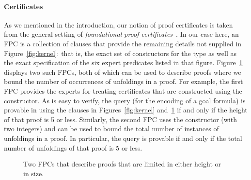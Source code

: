 \paragraph{Certificates}

{\color{red}
As we mentioned in the introduction, our notion of proof certificates
 is taken from the general setting of \emph{foundational
  proof certificates}~\cite{chihani17jar}.
%
In our case here, an FPC is a collection of \lP clauses that
provide the remaining details not supplied in Figure~\ref{fig:kernel}:
that is, the exact set of constructors for the  type as
well as the exact specification of the six expert predicates listed in
that figure.
%
Figure~\ref{fig:resources} displays two such FPCs,
both of which can be used to describe proofs where we bound
the number of occurrences of unfoldings in a proof.
%
For example, the first FPC
provides the experts for treating certificates that are constructed
using the  constructor.
%
As is easy to verify, the query \mbox{} (for the
encoding  of a goal formula) is provable in \lP using the
clauses in Figures~\ref{fig:kernel} and~\ref{fig:resources} if and
only if the height of that proof is 5 or less.
%
Similarly, the second FPC uses the constructor  (with two
integers) and can be used to bound the total number of instances of
unfoldings in a proof.
%
In particular, the query \mbox{}
is provable if and only if the total number of unfoldings of that
proof is 5 or less.

\begin{figure}


\caption{Two FPCs that describe proofs that are limited in either
  height or in size.}
\label{fig:resources}
\end{figure}

%

}
